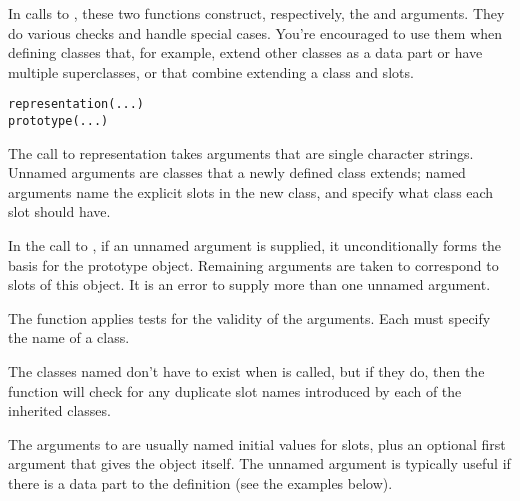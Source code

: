 %
\begin{Description}\relax
In calls to
, these two functions construct,
respectively, the  and 
arguments.  They do various checks and handle special cases.  You're
encouraged to use them when defining classes that, for
example, extend other classes as a data part or have multiple
superclasses, or that combine extending a class and slots.
\end{Description}
%
\begin{Usage}
\begin{verbatim}
representation(...)
prototype(...)
\end{verbatim}
\end{Usage}
%
\begin{Arguments}
\begin{ldescription}
\item[\code{...}] 
The call to representation takes arguments that are single character
strings.  Unnamed arguments are classes that a newly defined class
extends; named arguments name the explicit slots in the new class,
and specify what class each slot should have.

In the call to , if an unnamed argument is
supplied, it unconditionally forms the basis for the prototype
object.  Remaining arguments are taken to correspond to slots of
this object.  It is an error to supply more than one unnamed argument.

\end{ldescription}
\end{Arguments}
%
\begin{Details}\relax
The  function applies tests for the validity of
the arguments.  Each must specify the name of a class.

The classes named don't have to exist when  is
called, but if they do, then the function will check for any duplicate
slot names introduced by each of the inherited classes.

The arguments to  are usually named initial values
for slots, plus an optional first argument that gives the object
itself.  The unnamed argument is typically useful if there is a data
part to the definition (see the examples below).
\end{Details}
